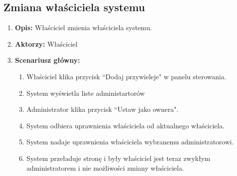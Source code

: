 \subsection{Zmiana właściciela systemu}
\begin{enumerate}
    \item \textbf{Opis:} Właściciel zmienia właściciela systemu.
    \item \textbf{Aktorzy:} Właściciel
    \item \textbf{Scenariusz główny:} 
    \begin{enumerate}
        \item Właściciel klika przycisk ``Dodaj przywieleje" w panelu sterowania.
        \item System wyświetla liste administartorów
        \item Administrator klika przycisk ``Ustaw jako ownera".
        \item System odbiera uprawnienia właściciela od aktualnego właściciela.
        \item System nadaje uprawnienia właściciela wybranemu administratorowi.
        \item System przeładuje stronę i były właściciel jest teraz zwykłym administratorem i nie możliwości zmiany właściciela.
    \end{enumerate}
\end{enumerate}